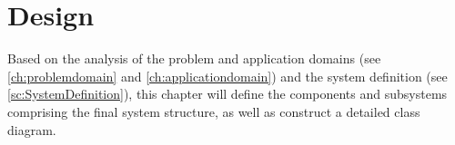 \chapter{Design} \label{ch:architectural_design}
Based on the analysis of the problem and application domains (see \autoref{ch:problemdomain} and \autoref{ch:applicationdomain}) and the system definition (see \autoref{sc:SystemDefinition}), this chapter will define the components and subsystems comprising the final system structure, as well as construct a detailed class diagram.